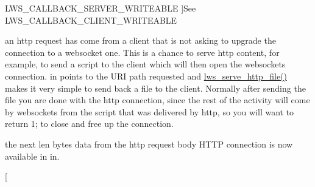 \begin{Desc}
\begin{description}
{L\+W\+S\+\_\+\+C\+A\+L\+L\+B\+A\+C\+K\+\_\+\+S\+E\+R\+V\+E\+R\+\_\+\+W\+R\+I\+T\+E\+A\+B\+LE\hypertarget{group__usercb_ggad62860e19975ba4c4af401c3cdb6abf7a7ec8e2e9557ee02a4fc9f7dec7e2babc}{}\label{group__usercb_ggad62860e19975ba4c4af401c3cdb6abf7a7ec8e2e9557ee02a4fc9f7dec7e2babc}
}]See L\+W\+S\+\_\+\+C\+A\+L\+L\+B\+A\+C\+K\+\_\+\+C\+L\+I\+E\+N\+T\+\_\+\+W\+R\+I\+T\+E\+A\+B\+LE \item[{\em 
L\+W\+S\+\_\+\+C\+A\+L\+L\+B\+A\+C\+K\+\_\+\+H\+T\+TP\hypertarget{group__usercb_ggad62860e19975ba4c4af401c3cdb6abf7ae8d1de0bb56e03aa58cb4d44b18edd2e}{}\label{group__usercb_ggad62860e19975ba4c4af401c3cdb6abf7ae8d1de0bb56e03aa58cb4d44b18edd2e}
}]an http request has come from a client that is not asking to upgrade the connection to a websocket one. This is a chance to serve http content, for example, to send a script to the client which will then open the websockets connection. in points to the U\+RI path requested and \hyperlink{group__httpft_gab393a06d3d2722af4c3f8b06842c80d7}{lws\+\_\+serve\+\_\+http\+\_\+file()} makes it very simple to send back a file to the client. Normally after sending the file you are done with the http connection, since the rest of the activity will come by websockets from the script that was delivered by http, so you will want to return 1; to close and free up the connection. \item[{\em 
L\+W\+S\+\_\+\+C\+A\+L\+L\+B\+A\+C\+K\+\_\+\+H\+T\+T\+P\+\_\+\+B\+O\+DY\hypertarget{group__usercb_ggad62860e19975ba4c4af401c3cdb6abf7ac4c68e00efcf1ff7bda7ada462aff8ae}{}\label{group__usercb_ggad62860e19975ba4c4af401c3cdb6abf7ac4c68e00efcf1ff7bda7ada462aff8ae}
}]the next len bytes data from the http request body H\+T\+TP connection is now available in in. \item[{\em 
}
\end{description}
\end{Desc}
